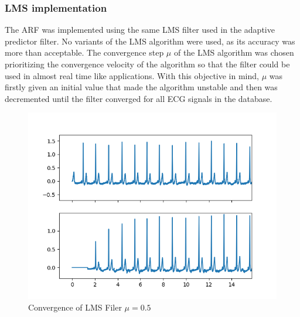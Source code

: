 \documentclass[conference]{IEEEtran}
\begin{document}
\subsubsection{LMS implementation} 
The ARF was implemented using the same LMS filter used in the adaptive predictor filter. No variants of the LMS algorithm were used, as its accuracy was more than acceptable. The convergence step $\mu$ of the LMS algorithm was chosen prioritizing the convergence velocity of the algorithm so that the filter could be used in almost real time like applications. With this objective in mind, $\mu$ was firstly given an initial value that made the algorithm unstable and then was decremented until the filter converged for all ECG signals in the database. \par
\begin{figure}[H]
\centerline{\includegraphics[scale=0.6]{imagenes/LMS_filter.png}}
\caption{Convergence of LMS Filer $\mu=0.5$}
\label{fig}
\end{figure}
\end{document}
